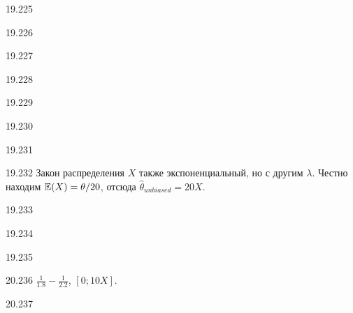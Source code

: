 \protect \hypertarget {soln:19.225}{}
\begin{solution}{{19.225}}

\end{solution}
\protect \hypertarget {soln:19.226}{}
\begin{solution}{{19.226}}

\end{solution}
\protect \hypertarget {soln:19.227}{}
\begin{solution}{{19.227}}

\end{solution}
\protect \hypertarget {soln:19.228}{}
\begin{solution}{{19.228}}

\end{solution}
\protect \hypertarget {soln:19.229}{}
\begin{solution}{{19.229}}

\end{solution}
\protect \hypertarget {soln:19.230}{}
\begin{solution}{{19.230}}

\end{solution}
\protect \hypertarget {soln:19.231}{}
\begin{solution}{{19.231}}

\end{solution}
\protect \hypertarget {soln:19.232}{}
\begin{solution}{{19.232}}
  Закон распределения $X$ также экспоненциальный, но с другим $\lambda$. Честно находим $\mathbb{E}(X)=\theta/20$, отсюда
  $\hat\theta_{unbiased} = 20X$.
\end{solution}
\protect \hypertarget {soln:19.233}{}
\begin{solution}{{19.233}}

\end{solution}
\protect \hypertarget {soln:19.234}{}
\begin{solution}{{19.234}}

\end{solution}
\protect \hypertarget {soln:19.235}{}
\begin{solution}{{19.235}}

\end{solution}
\protect \hypertarget {soln:20.236}{}
\begin{solution}{{20.236}}
  $\frac{1}{1.8} - \frac{1}{2.2}$, $[0;10X]$.
\end{solution}
\protect \hypertarget {soln:20.237}{}
\begin{solution}{{20.237}}
\end{solution}
